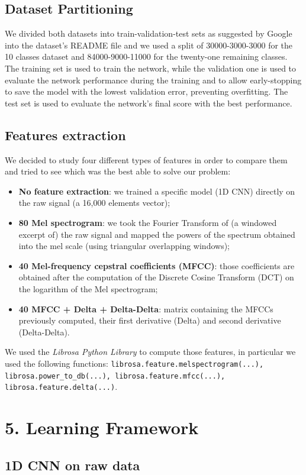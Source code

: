 \documentclass[conference]{IEEEtran}
\begin{document}
\subsection{Dataset Partitioning}
We divided both datasets into train-validation-test sets as suggested by Google into the dataset’s README file and we used a split of 30000-3000-3000 for the 10 classes dataset and 84000-9000-11000 for the twenty-one remaining classes. The training set is used to train the network, while the validation one is used to evaluate the network performance during the training and to allow early-stopping to save the model with the lowest validation error, preventing overfitting. The test set is used to evaluate the network’s final score with the best performance.

\subsection{Features extraction}
We decided to study four different types of features in order to compare them and tried to see which was the best able to solve our problem:
\begin{itemize}
\item \textbf{No feature extraction}: we trained a specific model (1D CNN) directly on the raw signal (a 16,000 elements vector);
\item \textbf{80 Mel spectrogram}: we took the Fourier Transform of (a windowed excerpt of) the raw signal and mapped the powers of the spectrum obtained into the mel scale (using triangular overlapping windows);
\item \textbf{40 Mel-frequency cepstral coefficients (MFCC)}: those coefficients are obtained after the computation of the Discrete Cosine Transform (DCT) on the logarithm of the Mel spectrogram;
\item \textbf{40 MFCC + Delta + Delta-Delta}: matrix containing the MFCCs previously computed, their first derivative (Delta) and second derivative (Delta-Delta).
\end{itemize}
We used the \textit{Librosa Python Library} to compute those features, in particular we used the following functions: \texttt{librosa.feature.melspectrogram(...), librosa.power\_to\_db(...), librosa.feature.mfcc(...), librosa.feature.delta(...)}.

\section{5.	Learning Framework}
\subsection{1D CNN on raw data}
\end{document}
